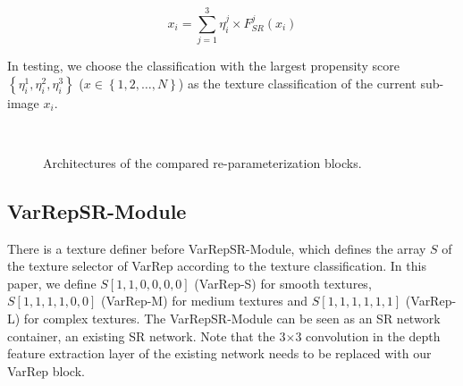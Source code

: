 \documentclass[sn-mathphys]{sn-jnl}%
\theoremstyle{thmstyleone}%
\theoremstyle{thmstyletwo}%
\theoremstyle{thmstylethree}%
\begin{document}
\begin{equation}
x_i=\sum_{j=1}^3 \eta_i^j \times F_{S R}^j\left(x_i\right)
\end{equation}

In testing, we choose the classification with the largest propensity score $\left\{\eta_i^1, \eta_i^2, \eta_i^3\right\}$ ($x \in \left\{1,2, \ldots, N\right\}$) as the texture classification of the current sub-image $x_i$.

\begin{figure}
    \centering
    \\
    \centering
    \vspace{-0.2cm}
    \caption{Architectures of the compared re-parameterization blocks.}
    \label{re-perameterization_blocks}
\end{figure}

\subsection{VarRepSR-Module}
There is a texture definer before VarRepSR-Module, which defines the array $S$ of the texture selector of VarRep according to the texture classification. In this paper, we define $S[1,1,0,0,0,0]$ (VarRep-S) for smooth textures, $S[1,1,1,1,0,0]$ (VarRep-M) for medium textures and $S[1,1,1,1,1,1]$ (VarRep-L) for complex textures. The VarRepSR-Module can be seen as an SR network container, an existing SR network. Note that the 3$\times$3 convolution in the depth feature extraction layer of the existing network needs to be replaced with our VarRep block.
\end{document}
